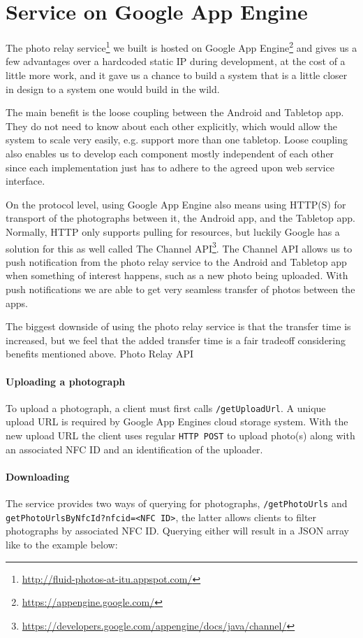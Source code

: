 \documentclass{ubicomp2011}
\begin{document}
\section{Service on Google App Engine}\label{service}

The photo relay service\footnote{\url{http://fluid-photos-at-itu.appspot.com/}} we built is hosted on Google App Engine\footnote{\url{https://appengine.google.com/}} and gives us a few advantages over a hardcoded static IP during development, at the cost of a little more work, and it gave us a chance to build a system that is a little closer in design to a system one would build in the wild.

The main benefit is the loose coupling between the Android and Tabletop app. They do not need to know about each other explicitly, which would allow the system to scale very easily, e.g. support more than one tabletop. Loose coupling also enables us to develop each component mostly independent of each other since each implementation just has to adhere to the agreed upon web service interface.

On the protocol level, using Google App Engine also means using HTTP(S) for transport of the photographs between it, the Android app, and the Tabletop app. Normally, HTTP only supports pulling for resources, but luckily Google has a solution for this as well called The Channel API\footnote{\url{https://developers.google.com/appengine/docs/java/channel/}}. The Channel API allows us to push notification from the photo relay service to the Android and Tabletop app when something of interest happens, such as a new photo being uploaded. With push notifications we are able to get very seamless transfer of photos between the apps.

The biggest downside of using the photo relay service is that the transfer time is increased, but we feel that the added transfer time is a fair tradeoff considering benefits mentioned above.
Photo Relay API

\paragraph{Uploading a photograph}
To upload a photograph, a client must first calls \lstinline{/getUploadUrl}. A unique upload URL is required by Google App Engines cloud storage system. With the new upload URL the client uses regular \lstinline{HTTP POST} to upload photo(s) along with an associated NFC ID and an identification of the uploader.

\paragraph{Downloading}
The service provides two ways of querying for photographs, \lstinline{/getPhotoUrls} and \lstinline{getPhotoUrlsByNfcId?nfcid=<NFC ID>}, the latter allows clients to filter photographs by associated NFC ID. Querying either will result in a JSON array like to the example below:
\end{document}
